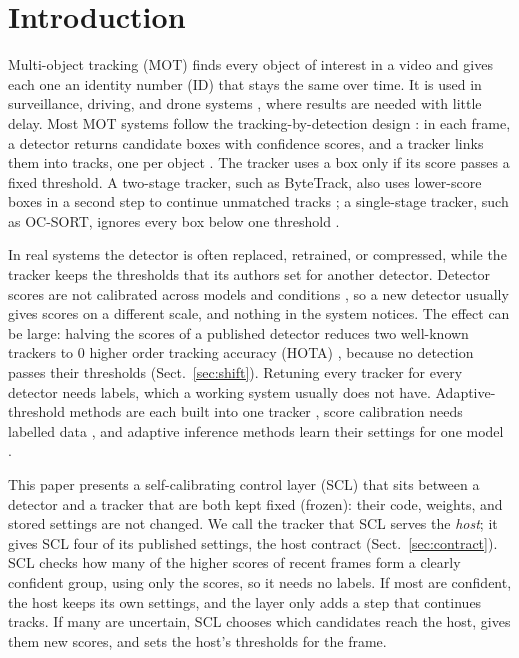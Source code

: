 \documentclass[pdflatex,sn-mathphys-num,iicol]{sn-jnl}
\newcommand{\scl}{SCL}
\begin{document}
\maketitle

\section{Introduction}\label{sec:intro}

Multi-object tracking (MOT) finds every object of interest in a video and gives each one an
identity number (ID) that stays the same over time. It is used in surveillance, driving, and drone
systems \cite{zhu2022visdrone,wu2022uavsurvey}, where results are needed with little delay. Most
MOT systems follow the tracking-by-detection design \cite{adzemovic2026survey}: in each frame, a
detector returns candidate boxes with confidence scores, and a tracker links them into tracks, one
per object \cite{bewley2016sort,zhang2022bytetrack,cao2023ocsort}. The tracker uses a box only if
its score passes a fixed threshold. A two-stage tracker, such as ByteTrack, also uses lower-score
boxes in a second step to continue unmatched tracks \cite{zhang2022bytetrack}; a single-stage
tracker, such as OC-SORT, ignores every box below one threshold \cite{cao2023ocsort}.

In real systems the detector is often replaced, retrained, or compressed, while the tracker keeps
the thresholds that its authors set for another detector. Detector scores are not calibrated across
models and conditions \cite{kuppers2020detcalib}, so a new detector usually gives scores on a
different scale, and nothing in the system notices. The effect can be large: halving the scores of
a published detector reduces two well-known trackers to 0 higher order tracking accuracy (HOTA)
\cite{luiten2021hota}, because no detection passes their thresholds (Sect.~\ref{sec:shift}).
Retuning every tracker for every detector needs labels, which a working system usually does not
have. Adaptive-threshold methods are each built into one tracker
\cite{ma2023adaptivebytetrack,shim2024adaptrack,act2026adaptive}, score calibration needs
labelled data \cite{kuppers2020detcalib}, and adaptive inference methods learn their settings for
one model \cite{han2022dynamic,jiang2018chameleon}.

This paper presents a self-calibrating control layer (\scl{}) that sits between a detector and a
tracker that are both kept fixed (frozen): their code, weights, and stored settings are not
changed. We call the tracker that \scl{} serves the \emph{host}; it gives \scl{} four of its
published settings, the host contract (Sect.~\ref{sec:contract}). \scl{} checks how many of the
higher scores of recent frames form a clearly confident group, using only the scores, so it needs
no labels. If most are confident, the host keeps its own settings, and the layer only adds a step
that continues tracks. If many are uncertain, \scl{} chooses which candidates reach the host, gives
them new scores, and sets the host's thresholds for the frame.
\end{document}
